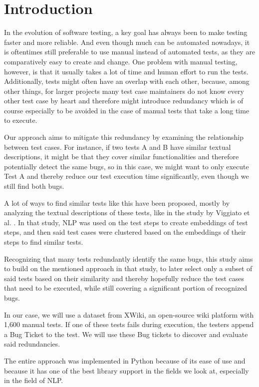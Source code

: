 \section{Introduction}

In the evolution of software testing, a key goal has always been to make testing faster and more reliable. And even though much can be automated nowadays, it is oftentimes still preferable to use manual instead of automated tests, as they are comparatively easy to create and change. One problem with manual testing, however, is that it usually takes a lot of time and human effort to run the tests. Additionally, tests might often have an overlap with each other, because, among other things, for larger projects many test case maintainers do not know every other test case by heart and therefore might introduce redundancy which is of course especially to be avoided in the case of manual tests that take a long time to execute.

Our approach aims to mitigate this redundancy by examining the relationship between test cases. For instance, if two tests A and B have similar textual descriptions, it might be that they cover similar functionalities and therefore potentially detect the same bugs, so in this case, we might want to only execute Test A and thereby reduce our test execution time significantly, even though we still find both bugs. 

A lot of ways to find similar tests like this have been proposed, mostly by analyzing the textual descriptions of these tests, like in the study by Viggiato et al. \cite{Viggiato}. In that study, \ac{NLP} was used on the test steps to create embeddings of test steps, and then said test cases were clustered based on the embeddings of their steps to find similar tests.

Recognizing that many tests redundantly identify the same bugs, this study aims to build on the mentioned approach in that study, to later select only a subset of said tests based on their similarity and thereby hopefully reduce the test cases that need to be executed, while still covering a significant portion of recognized bugs.

In our case, we will use a dataset from XWiki, an open-source wiki platform with 1,600 manual tests. If one of these tests fails during execution, the testers append a Bug Ticket to the test. We will use these Bug tickets to discover and evaluate said redundancies.

The entire approach was implemented in Python because of its ease of use and because it has one of the best library support in the fields we look at, especially in the field of \ac{NLP}.